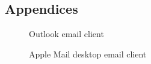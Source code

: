 \documentclass{l4proj}
\begin{document}
\begin{appendices}

\chapter{Appendices}

\begin{figure}[H]
    \centering
    \caption{Outlook email client}
    \label{fig:outlook}
\end{figure}



\begin{figure}[H]
    \caption{Apple Mail desktop email client}
    \label{fig:applemail}
\end{figure}




\end{appendices}
\end{document}
